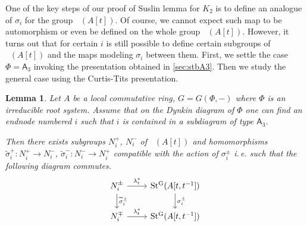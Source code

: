 \documentclass[oneside,12pt]{amsart}
\numberwithin{equation}{section}
\newtheorem{lem}{Lemma}
\numberwithin{lem}{section}
\theoremstyle{definition}
\theoremstyle{remark}
\DeclareMathOperator{\St}{St^G}
\newcommand{\rA}{\mathsf{A}}
\begin{document}
One of the key steps of our proof of Suslin lemma for $K_2$ is to define an analogue of $\sigma_i$ for the group $\St(A[t])$.
Of course, we cannot expect such map to be automorphism or even be defined on the whole group $\St(A[t])$.
However, it turns out that for certain $i$ is still possible to define certain subgroups of $\St(A[t])$ and the maps modeling $\sigma_i$ between them.
First, we settle the case $\Phi=\rA_3$ invoking the presentation obtained in \ref{sec:stbA3}.
Then we study the general case using the Curtis-Tits presentation.

\begin{lem} \label{lem:sigma}
 Let $A$ be a local commutative ring, $G = G(\Phi, -)$ where $\Phi$ is an irreducible root system.
 Assume that on the Dynkin diagram of $\Phi$ one can find an endnode numbered $i$ such that $i$ is contained in a subdiagram of type $\rA_3$.

 Then there exists subgroups $N_i^+$, $N_i^-$ of $\St(A[t])$ and homomorphisms $\widetilde{\sigma}_i^+ \colon N_i^+ \to N_i^-$, $\widetilde{\sigma}_i^-\colon N_i^- \to N_i^+$
 compatible with the action of $\sigma_i^\pm$ i.\,e. such that the following diagram commutes.
 \[\begin{tikzcd} N_i^\pm \arrow[r, "\lambda_t^*"] \arrow[d, "\widetilde{\sigma}_i^\pm"]          &  \St(A[t, t^{-1}]) \ar[d, "\sigma_i^\pm"] \\
                  N_i^\mp \arrow[r, "\lambda_t^*"] &  \St(A[t, t^{-1}]) \end{tikzcd}\]

\end{lem}
\end{document}
